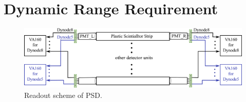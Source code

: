 \documentclass[5p, times]{elsarticle}
\begin{document}

\section{Dynamic Range Requirement}
\label{sec:requirement}

\begin{figure}
\centering
 \includegraphics[width=140mm]{readout_scheme}
\caption{Readout scheme of PSD.}
\label{fig:readout_scheme}
\end{figure} 
\end{document}

